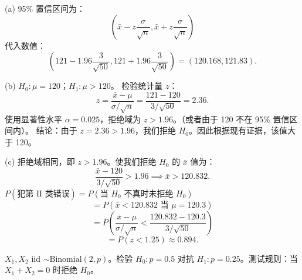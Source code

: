 \begin{questions}
\begin{solution}
(a) 95\% 置信区间为：
\[ \left( \bar{x} - z \frac{\sigma}{\sqrt{n}}, \bar{x} + z \frac{\sigma}{\sqrt{n}} \right) \]
代入数值：
\[ \left( 121 - 1.96 \frac{3}{\sqrt{50}}, 121 + 1.96 \frac{3}{\sqrt{50}} \right) = (120.168, 121.83). \]

(b) $H_0 : \mu = 120$；$H_1 : \mu > 120$。
检验统计量 $z$：
\[ z = \frac{\bar{x} - \mu}{\sigma / \sqrt{n}} = \frac{121 - 120}{3 / \sqrt{50}} = 2.36. \]
使用显著性水平 $\alpha = 0.025$，拒绝域为 $z > 1.96$。（或者由于 120 不在 95\% 置信区间内）。
结论：由于 $z = 2.36 > 1.96$，我们拒绝 $H_0$。因此根据现有证据，该值大于 120。

(c) 拒绝域相同，即 $z > 1.96$。使我们拒绝 $H_0$ 的 $\bar{x}$ 值为：
\[ \frac{\bar{x} - 120}{3 / \sqrt{50}} > 1.96 \implies \bar{x} > 120.832. \]
$P(\text{犯第 II 类错误}) = P(\text{当 } H_0 \text{ 不真时未拒绝 } H_0)$
\[ = P(\bar{x} < 120.832 \text{ 当 } \mu = 120.3) \]
\[ = P\left( \frac{\bar{x} - \mu}{\sigma / \sqrt{n}} < \frac{120.832 - 120.3}{3 / \sqrt{50}} \right) \]
\[ = P(z < 1.25) \approx 0.894. \]
\end{solution}

\question $X_1, X_2$ iid $\sim \text{Binomial}(2, p)$。检验 $H_0 : p = 0.5$ 对抗 $H_1 : p = 0.25$。测试规则：当 $X_1 + X_2 = 0$ 时拒绝 $H_0$。



\end{questions}
